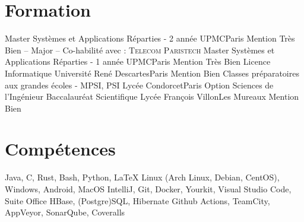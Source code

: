 \documentclass[11pt,a4paper,sans]{moderncv}
\begin{document}

\section{Formation}
\vspace{1em}

        {Master Systèmes et Applications Réparties - 2 année}
        {UPMC}{Paris}{}
        {Mention Très Bien -- Major -- Co-habilité avec : \textsc{Telecom Paristech}}
        {Master Systèmes et Applications Réparties - 1 année}
        {UPMC}{Paris}{}
        {Mention Très Bien}
        {Licence Informatique}
        {Université René Descartes}{Paris}{}
        {Mention Bien}
        {Classes préparatoires aux grandes écoles - MPSI, PSI\up{*}}
        {Lycée Condorcet}{Paris}{}
        {Option Sciences de l'Ingénieur}
        {Baccalauréat Scientifique}
        {Lycée François Villon}{Les Mureaux}{}
        {Mention Bien}

\vspace{0.5em}


\section{Compétences}
\vspace{1em}

       {
            Java,
            C,
            Rust,
            Bash,
            Python,
            LaTeX
       }
       {
            Linux (Arch Linux, Debian, CentOS),
            Windows,
            Android,
            MacOS
       }
       {
            IntelliJ,
            Git,
            Docker,
            Yourkit,
            Visual Studio Code,
            Suite Office
       }
       {
            HBase,
            (Postgre)SQL,
            Hibernate
       }
       {
            Github Actions,
            TeamCity,
            AppVeyor,
            SonarQube,
            Coveralls
       }

\vspace{0.5em}

\end{document}
